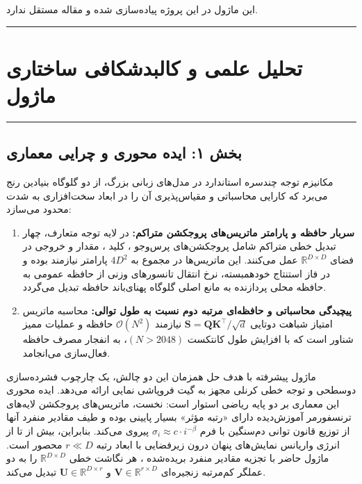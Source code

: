 \clearpage
{}
\vspace*{0.2cm}

این ماژول در این پروژه پیاده‌سازی شده و مقاله مستقل ندارد.
\noindent\rule{\textwidth}{1.2pt}
\vspace*{0.1cm}
\section{تحلیل علمی و کالبدشکافی ساختاری ماژول }
\label{sec:mod_svd_linear_attention}
\vspace*{-0.2cm}
\noindent\rule{\textwidth}{0.5pt}
\vspace*{0.3cm}

\subsection*{بخش ۱: ایده محوری و چرایی معماری }

مکانیزم توجه چندسره استاندارد  در مدل‌های زبانی بزرگ، از دو گلوگاه بنیادین رنج می‌برد که کارایی محاسباتی و مقیاس‌پذیری آن را در ابعاد سخت‌افزاری به شدت محدود می‌سازد:
\begin{enumerate}
    \item \textbf{سربار حافظه و پارامتر ماتریس‌های پروجکشن متراکم:} در لایه توجه متعارف، چهار تبدیل خطی متراکم شامل پروجکشن‌های پرس‌وجو ، کلید ، مقدار  و خروجی  در فضای $\mathbb{R}^{D \times D}$ عمل می‌کنند. این ماتریس‌ها در مجموع به $4D^2$ پارامتر نیازمند بوده و در فاز استنتاج خودهمبسته، نرخ انتقال تانسورهای وزنی از حافظه عمومی  به حافظه محلی پردازنده  به مانع اصلی گلوگاه پهنای‌باند حافظه  تبدیل می‌گردد.
    \item \textbf{پیچیدگی محاسباتی و حافظه‌ای مرتبه دوم نسبت به طول توالی:} محاسبه ماتریس امتیاز شباهت دوتایی $\mathbf{S} = \mathbf{Q}\mathbf{K}^\top / \sqrt{d}$ نیازمند $\mathcal{O}(N^2)$ حافظه و عملیات ممیز شناور  است که با افزایش طول کانتکست $(N > 2048)$، به انفجار مصرف حافظه فعال‌سازی  می‌انجامد.
\end{enumerate}

ماژول پیشرفته  با هدف حل همزمان این دو چالش، یک چارچوب فشرده‌سازی دو‌سطحی و توجه خطی کرنلی مجهز به گیت فروپاشی نمایی ارائه می‌دهد. ایده محوری این معماری بر دو پایه ریاضی استوار است:
نخست، ماتریس‌های پروجکشن لایه‌های ترنسفورمر آموزش‌دیده دارای «رتبه مؤثر»  بسیار پایینی بوده و طیف مقادیر منفرد آنها از توزیع قانون توانی دم‌سنگین  با فرم $\sigma_i \approx c \cdot i^{-\beta}$ پیروی می‌کند. بنابراین، بیش از  تا  از انرژی واریانس نمایش‌های پنهان درون زیرفضایی با ابعاد رتبه $r \ll D$ محصور است. ماژول حاضر با تجزیه مقادیر منفرد بریده‌شده ، هر نگاشت خطی $\mathbb{R}^{D \times D}$ را به دو عملگر کم‌مرتبه زنجیره‌ای $\mathbf{V} \in \mathbb{R}^{r \times D}$ و $\mathbf{U} \in \mathbb{R}^{D \times r}$ تبدیل می‌کند.

